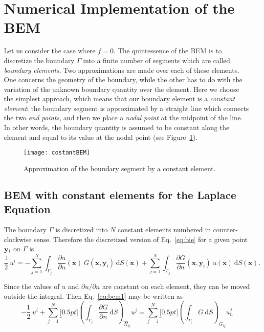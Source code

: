 
\section{Numerical Implementation of the BEM}
\label{sec:numerical_implementation_of_the_bem}%

Let us consider the case where $f=0$. The quintessence of the BEM is to discretize the boundary $\Gamma$ into a finite number of segments which are called \emph{boundary elements}. Two approximations are made over each of these elements. One concerns the geometry of the boundary, while the other has to do with the variation of the unknown boundary quantity over the element. Here we choose the simplest approach, which means that our boundary element is a \emph{constant element}: the boundary segment is approximated by a straight line which connects the two \emph{end points}, and then we place a \emph{nodal point} at the midpoint of the line. In other words, the boundary quantity is assumed to be constant along the element and equal to its value at the nodal point (see Figure~\ref{fig:costant}).

\begin{figure}[H]
  \centering
    \texttt{[image: costantBEM]}
    \caption{Approximation of the boundary segment by a constant element.} 
    \label{fig:costant}
\end{figure}

\subsection{BEM with constant elements for the Laplace Equation}
\label{sub:bem_with_constant_elements}%

The boundary $\Gamma$ is discretized into $N$ constant elements numbered in counter-clockwise sense. Therefore the discretized version of Eq.~\eqref{eq:bie} for a given point $\mathbf{y}_i$ on $\Gamma$ is 
\begin{equation}
\label{eq:bem1}
\frac{1}{2}\ u^i =-\sum_{j=1}^N \int_{\Gamma_j} \frac{\partial u}{\partial n}(\mathbf{x})\ G(\mathbf{x},\mathbf{y}_i)\ \mathrm{d}S(\mathbf{x}) +\sum_{j=1}^N \int_{\Gamma_j} \frac{\partial G}{\partial n}(\mathbf{x},\mathbf{y}_i)\ u(\mathbf{x}) \ \mathrm{d}S(\mathbf{x}).
\end{equation}

Since the values of $u$ and $\partial u / \partial n$ are constant on each element, they can be moved outside the integral. Then Eq.~\eqref{eq:bem1} may be written as
\begin{equation}
\label{eq:bem2}
-\frac{1}{2}\ u^i +\sum_{j=1}^N \underbracket[0.5pt]{\left( \int_{\Gamma_j} \frac{\partial G}{\partial n}\ \mathrm{d}S \right)}_{\hat{H}_{ij}} u^j=\sum_{j=1}^N \underbracket[0.5pt]{\left( \int_{\Gamma_j} G\ \mathrm{d}S \right)}_{G_{ij}}u_n^j
\end{equation}

